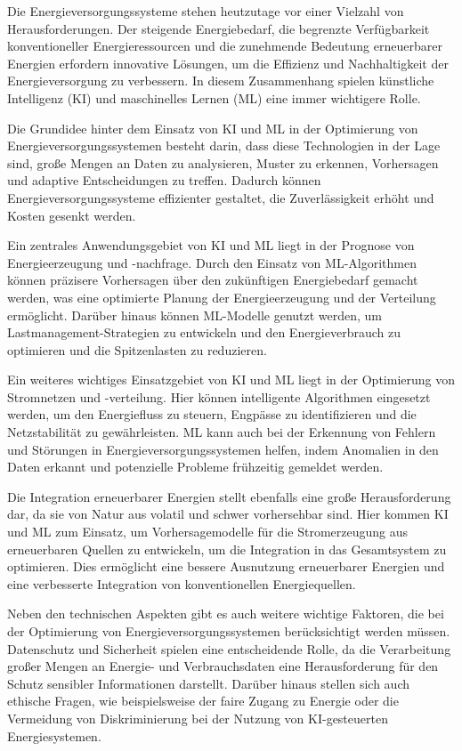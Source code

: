 Die Energieversorgungssysteme stehen heutzutage vor einer Vielzahl von
Herausforderungen. Der steigende Energiebedarf, die begrenzte Verfügbarkeit
konventioneller Energieressourcen und die zunehmende Bedeutung erneuerbarer
Energien erfordern innovative Lösungen, um die Effizienz und Nachhaltigkeit der
Energieversorgung zu verbessern. In diesem Zusammenhang spielen künstliche
Intelligenz (KI) und maschinelles Lernen (ML) eine immer wichtigere Rolle.

Die Grundidee hinter dem Einsatz von KI und ML in der Optimierung von
Energieversorgungssystemen besteht darin, dass diese Technologien in der Lage
sind, große Mengen an Daten zu analysieren, Muster zu erkennen, Vorhersagen und adaptive Entscheidungen zu treffen. Dadurch können
Energieversorgungssysteme effizienter gestaltet, die Zuverlässigkeit erhöht und
Kosten gesenkt werden.

Ein zentrales Anwendungsgebiet von KI und ML liegt in der Prognose von
Energieerzeugung und -nachfrage. Durch den Einsatz von ML-Algorithmen können
präzisere Vorhersagen über den zukünftigen Energiebedarf gemacht werden, was
eine optimierte Planung der Energieerzeugung und der Verteilung ermöglicht.
Darüber hinaus können ML-Modelle genutzt werden, um Lastmanagement-Strategien
zu entwickeln und den Energieverbrauch zu optimieren und die Spitzenlasten zu
reduzieren.

Ein weiteres wichtiges Einsatzgebiet von KI und ML liegt in der Optimierung von
Stromnetzen und -verteilung. Hier können intelligente Algorithmen eingesetzt
werden, um den Energiefluss zu steuern, Engpässe zu identifizieren und die
Netzstabilität zu gewährleisten. ML kann auch bei der Erkennung von Fehlern und
Störungen in Energieversorgungssystemen helfen, indem Anomalien in den Daten
erkannt und potenzielle Probleme frühzeitig gemeldet werden.

Die Integration erneuerbarer Energien stellt ebenfalls eine große
Herausforderung dar, da sie von Natur aus volatil und schwer vorhersehbar sind.
Hier kommen KI und ML zum Einsatz, um Vorhersagemodelle für die Stromerzeugung
aus erneuerbaren Quellen zu entwickeln, um die Integration in das Gesamtsystem
zu optimieren. Dies ermöglicht eine bessere Ausnutzung erneuerbarer Energien
und eine verbesserte Integration von konventionellen Energiequellen.

Neben den technischen Aspekten gibt es auch weitere wichtige Faktoren, die bei
der Optimierung von Energieversorgungssystemen berücksichtigt werden müssen.
Datenschutz und Sicherheit spielen eine entscheidende Rolle, da die
Verarbeitung großer Mengen an Energie- und Verbrauchsdaten eine Herausforderung
für den Schutz sensibler Informationen darstellt. Darüber hinaus stellen sich
auch ethische Fragen, wie beispielsweise der faire Zugang zu Energie oder die
Vermeidung von Diskriminierung bei der Nutzung von KI-gesteuerten
Energiesystemen.

